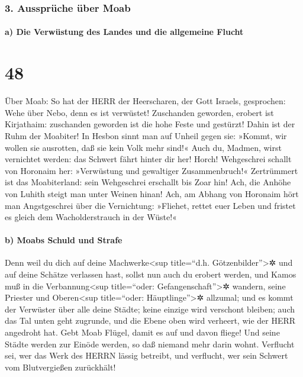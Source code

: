 \hypertarget{ausspruxfcche-uxfcber-moab}{%
\subsubsection{3. Aussprüche über
Moab}\label{ausspruxfcche-uxfcber-moab}}

\hypertarget{a-die-verwuxfcstung-des-landes-und-die-allgemeine-flucht}{%
\paragraph{a) Die Verwüstung des Landes und die allgemeine
Flucht}\label{a-die-verwuxfcstung-des-landes-und-die-allgemeine-flucht}}

\hypertarget{section-47}{%
\section{48}\label{section-47}}

Über Moab: So hat der HERR der Heerscharen, der Gott
Israels, gesprochen: Wehe über Nebo, denn es ist verwüstet! Zuschanden
geworden, erobert ist Kirjathaim: zuschanden geworden ist die hohe Feste
und gestürzt! Dahin ist der Ruhm der Moabiter! In Hesbon
sinnt man auf Unheil gegen sie: »Kommt, wir wollen sie ausrotten, daß
sie kein Volk mehr sind!« Auch du, Madmen, wirst vernichtet werden: das
Schwert fährt hinter dir her! Horch! Wehgeschrei schallt
von Horonaim her: »Verwüstung und gewaltiger Zusammenbruch!«
Zertrümmert ist das Moabiterland: sein Wehgeschrei
erschallt bis Zoar hin! Ach, die Anhöhe von Luhith steigt
man unter Weinen hinan! Ach, am Abhang von Horonaim hört man
Angstgeschrei über die Vernichtung: »Fliehet, rettet euer
Leben und fristet es gleich dem Wacholderstrauch in der Wüste!«

\hypertarget{b-moabs-schuld-und-strafe}{%
\paragraph{b) Moabs Schuld und Strafe}\label{b-moabs-schuld-und-strafe}}

Denn weil du dich auf deine Machwerke\textless sup
title=``d.h. Götzenbilder''\textgreater✲ und auf deine Schätze verlassen
hast, sollst nun auch du erobert werden, und Kamos muß in die
Verbannung\textless sup title=``oder: Gefangenschaft''\textgreater✲
wandern, seine Priester und Oberen\textless sup title=``oder:
Häuptlinge''\textgreater✲ allzumal; und es kommt der
Verwüster über alle deine Städte; keine einzige wird verschont bleiben;
auch das Tal unten geht zugrunde, und die Ebene oben wird verheert, wie
der HERR angedroht hat. Gebt Moab Flügel, damit es auf und
davon fliege! Und seine Städte werden zur Einöde werden, so daß niemand
mehr darin wohnt. Verflucht sei, wer das Werk des HERRN
lässig betreibt, und verflucht, wer sein Schwert vom Blutvergießen
zurückhält!

